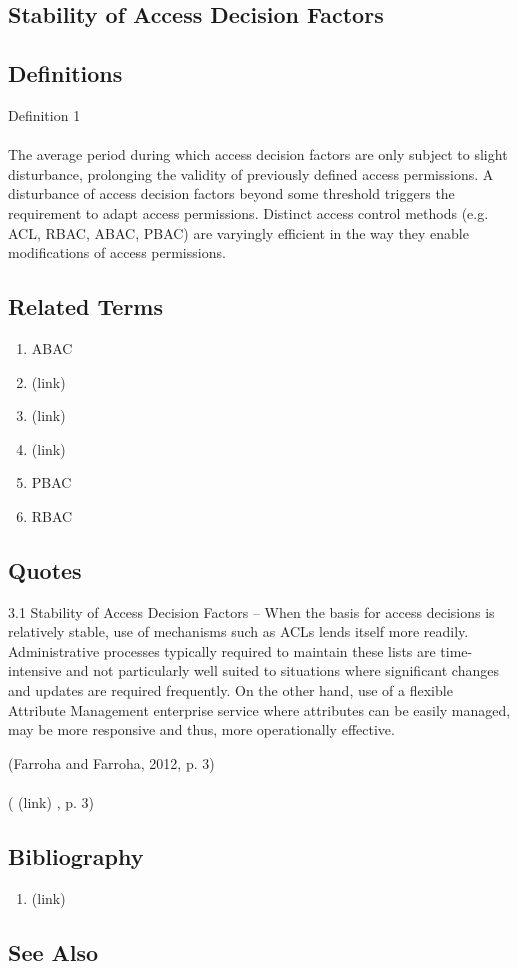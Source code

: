 \newpage \subsection*{Stability of Access Decision Factors } \subsection*{Definitions } \begin{DIC_Def}{Definition 1 }{} \paragraph{} The average period during which access decision factors are only subject to slight disturbance, prolonging the validity of previously defined access permissions. A disturbance of access decision factors beyond some threshold triggers the requirement to adapt access permissions. Distinct access control methods (e.g. ACL, RBAC, ABAC, PBAC) are varyingly efficient in the way they enable modifications of access permissions.  \end{DIC_Def} \subsection*{Related Terms } \begin{enumerate} \item  ABAC  \item  (link) \href{Access (Dictionary Entry) }{ }   \item  (link) \href{Access Control (Dictionary Entry) }{ }   \item  (link) \href{Access Control List (Dictionary Entry) }{ }   \item  PBAC  \item  RBAC  \end{enumerate} \subsection*{Quotes } \begin{DIC_BlockQuote} 3.1 Stability of Access Decision Factors -- When the basis for access decisions is relatively stable, use of mechanisms such as ACLs lends itself more readily. Administrative processes typically required to maintain these lists are time-intensive and not particularly well suited to situations where significant changes and updates are required frequently. On the other hand, use of a flexible Attribute Management enterprise service where attributes can be easily managed, may be more responsive and thus, more operationally effective.  \end{DIC_BlockQuote} (Farroha and Farroha, 2012, p. 3)  \paragraph{} (  (link) \href{Farroha and Farroha, 2012 }{ } , p. 3)  \subsection*{Bibliography } \begin{enumerate} \item  (link) \href{Farroha and Farroha, 2012 }{ }   \end{enumerate} \subsection*{See Also } 